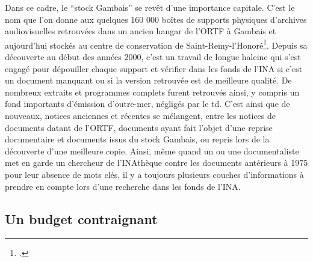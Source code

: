 Dans ce cadre, le \enquote{stock Gambais} se revêt d'une importance capitale. C'est le nom que l'on donne aux quelques 160 000 boîtes de supports physiques d'archives audiovisuelles retrouvées dans un ancien hangar de l'ORTF à Gambais et aujourd'hui stockés au centre de conservation de Saint-Remy-l'Honoré\footcite[]{theque2024}. Depuis sa découverte au début des années 2000, c'est un travail de longue haleine qui s'est engagé pour dépouiller chaque support et vérifier dans les fonds de l'INA si c'est un document manquant ou si la version retrouvée est de meilleure qualité. De nombreux extraits et programmes complets furent retrouvés ainsi, y compris un fond importants d'émission d'outre-mer, négligés par le \gls{td}. C'est ainsi que de nouveaux, notices anciennes et récentes se mélangent, entre les notices de documents datant de l'ORTF, documents ayant fait l'objet d'une reprise documentaire et documents issus du stock Gambais, ou repris lors de la découverte d'une meilleure copie. Ainsi, même quand un ou une documentaliste met en garde un chercheur de l'INAthèque contre les documents antérieurs à 1975 pour leur absence de mots clés, il y a toujours plusieurs couches d'informations à prendre en compte lors d'une recherche dans les fonds de l'INA. 

\subsection{Un budget contraignant}

